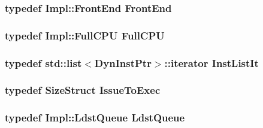 \hypertarget{classBackEnd_abe8e1d8243582d5024a1076f6091d9fe}{
\subsubsection[{FrontEnd}]{\setlength{\rightskip}{0pt plus 5cm}typedef Impl::FrontEnd {\bf FrontEnd}}}
\label{classBackEnd_abe8e1d8243582d5024a1076f6091d9fe}
\hypertarget{classBackEnd_a90ba84e54618cc07f2e8f05e046cb5ce}{
\subsubsection[{FullCPU}]{\setlength{\rightskip}{0pt plus 5cm}typedef Impl::FullCPU {\bf FullCPU}}}
\label{classBackEnd_a90ba84e54618cc07f2e8f05e046cb5ce}
\hypertarget{classBackEnd_a4da46d72d68fcd5bfe65dc701c358379}{
\subsubsection[{InstListIt}]{\setlength{\rightskip}{0pt plus 5cm}typedef {\bf std::list}$<${\bf DynInstPtr}$>$::iterator {\bf InstListIt}}}
\label{classBackEnd_a4da46d72d68fcd5bfe65dc701c358379}
\hypertarget{classBackEnd_a5badfe54e71b8fccb3d371013a8eef73}{
\subsubsection[{IssueToExec}]{\setlength{\rightskip}{0pt plus 5cm}typedef {\bf SizeStruct} {\bf IssueToExec}}}
\label{classBackEnd_a5badfe54e71b8fccb3d371013a8eef73}
\hypertarget{classBackEnd_a4c90230ea80fdcedea6e4fb9b43009cd}{
\subsubsection[{LdstQueue}]{\setlength{\rightskip}{0pt plus 5cm}typedef Impl::LdstQueue {\bf LdstQueue}}}
\label{classBackEnd_a4c90230ea80fdcedea6e4fb9b43009cd}
